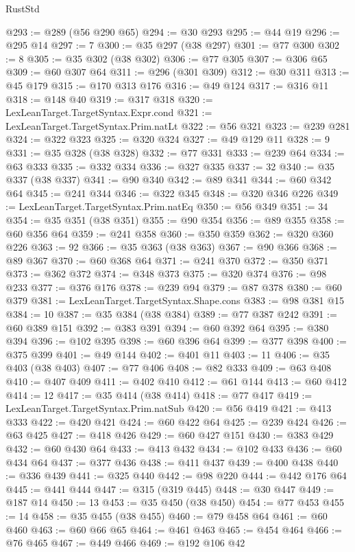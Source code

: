 \begin{lexlean}{RustStd}
\begin{coremodule}
{\begin{coremodule}
{{{{{{{{{{{{{{{{{{{{{{{{{{{{{{{{@293 := @289 (@56 @290 @65)
@294 := @30 @293
@295 := @44 @19
@296 := @295 @14
@297 := 7
@300 := @35 @297 (@38 @297)
@301 := @77 @300
@302 := 8
@305 := @35 @302 (@38 @302)
@306 := @77 @305
@307 := @306 @65
@309 := @60 @307 @64
@311 := @296 (@301 @309)
@312 := @30 @311
@313 := @45 @179
@315 := @170 @313 @176
@316 := @49 @124
@317 := @316 @11
@318 := @148 @40
@319 := @317 @318
@320 := LexLeanTarget.TargetSyntax.Expr.cond
@321 := LexLeanTarget.TargetSyntax.Prim.natLt
@322 := @56 @321
@323 := @239 @281
@324 := @322 @323
@325 := @320 @324
@327 := @49 @129 @11
@328 := 9
@331 := @35 @328 (@38 @328)
@332 := @77 @331
@333 := @239 @64
@334 := @63 @333
@335 := @332 @334
@336 := @327 @335
@337 := 32
@340 := @35 @337 (@38 @337)
@341 := @90 @340
@342 := @89 @341
@344 := @60 @342 @64
@345 := @241 @344
@346 := @322 @345
@348 := @320 @346 @226
@349 := LexLeanTarget.TargetSyntax.Prim.natEq
@350 := @56 @349
@351 := 34
@354 := @35 @351 (@38 @351)
@355 := @90 @354
@356 := @89 @355
@358 := @60 @356 @64
@359 := @241 @358
@360 := @350 @359
@362 := @320 @360 @226
@363 := 92
@366 := @35 @363 (@38 @363)
@367 := @90 @366
@368 := @89 @367
@370 := @60 @368 @64
@371 := @241 @370
@372 := @350 @371
@373 := @362 @372
@374 := @348 @373
@375 := @320 @374
@376 := @98 @233
@377 := @376 @176
@378 := @239 @94
@379 := @87 @378
@380 := @60 @379
@381 := LexLeanTarget.TargetSyntax.Shape.cons
@383 := @98 @381 @15
@384 := 10
@387 := @35 @384 (@38 @384)
@389 := @77 @387 @242
@391 := @60 @389 @151
@392 := @383 @391
@394 := @60 @392 @64
@395 := @380 @394
@396 := @102 @395
@398 := @60 @396 @64
@399 := @377 @398
@400 := @375 @399
@401 := @49 @144
@402 := @401 @11
@403 := 11
@406 := @35 @403 (@38 @403)
@407 := @77 @406
@408 := @82 @333
@409 := @63 @408
@410 := @407 @409
@411 := @402 @410
@412 := @61 @144
@413 := @60 @412
@414 := 12
@417 := @35 @414 (@38 @414)
@418 := @77 @417
@419 := LexLeanTarget.TargetSyntax.Prim.natSub
@420 := @56 @419
@421 := @413 @333
@422 := @420 @421
@424 := @60 @422 @64
@425 := @239 @424
@426 := @63 @425
@427 := @418 @426
@429 := @60 @427 @151
@430 := @383 @429
@432 := @60 @430 @64
@433 := @413 @432
@434 := @102 @433
@436 := @60 @434 @64
@437 := @377 @436
@438 := @411 @437
@439 := @400 @438
@440 := @336 @439
@441 := @325 @440
@442 := @98 @220
@444 := @442 @176 @64
@445 := @441 @444
@447 := @315 (@319 @445)
@448 := @30 @447
@449 := @187 @14
@450 := 13
@453 := @35 @450 (@38 @450)
@454 := @77 @453
@455 := 14
@458 := @35 @455 (@38 @455)
@460 := @79 @458 @64
@461 := @60 @460
@463 := @60 @66 @65
@464 := @461 @463
@465 := @454 @464
@466 := @76 @465
@467 := @449 @466
@469 := @192 @106 @42
}}}}}}}}}}}}}}}}}}}}}}}}}}}}}}}}
\end{coremodule}}
\end{coremodule}
\end{lexlean}
